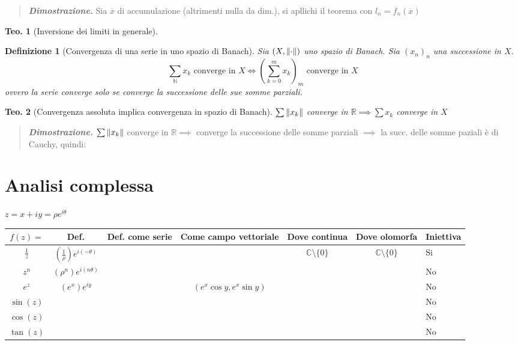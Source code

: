 \documentclass[a4paper,10pt]{article}
\newcommand{\re}{\mathbb{R}} %
\newcommand{\na}{\mathbb{N}} %
\newcommand{\im}{\mathbb{C}} %
\theoremstyle{indentdefinition}
\newtheorem{defn}{Definizione}[section]
\theoremstyle{indenttheorem}
\newtheorem{thm}{Teo.}
\theoremstyle{myremark}
\theoremstyle{indentgeneral}
\newenvironment{dimo}{\begin{quote}\textit{\textbf{Dimostrazione.}}}{\end{quote}} %
\begin{document}
\begin{dimo}
    Sia $\overline{x}$ di accumulazione (altrimenti nulla da dim.), si apllichi il teorema con $l_n=f_n(\overline{x})$
\end{dimo}
\begin{thm}[Inversione dei limiti in generale]
    
\end{thm}
\begin{defn}[Convergenza di una serie in uno spazio di Banach]
    Sia $(X,\norm{\cdot})$  uno spazio di Banach. Sia $(x_n)_n$ una successione in $X$.
$$\sum_\na x_k \text{ converge in $X$}\iff \left(\sum_{k=0}^mx_k\right)_m \text{ converge in $X$}$$
ovvero la serie converge solo se converge la successione delle sue somme parziali.
\end{defn}
\begin{thm}[Convergenza assoluta implica convergenza in spazio di Banach]
$\sum \norm{x_k}$ converge in $\re\implies \sum x_k$ converge in $X$
\end{thm}
\begin{dimo}
$\sum \norm{x_k}$ converge in $\re\implies$ converge la successione delle somme parziali $\implies$ la succ. delle somme paziali è di Cauchy, quindi:

    
\end{dimo}

\newpage
\part{Analisi complessa}
$z=x+iy=\rho e^{i\theta}$

\begin{table}[h]
    \centering
    \begin{tabular}{|c|c|c|c|c|c|l|} \hline 
         $f(z)=$&  Def. &Def. come serie&  Come campo  vettoriale&  Dove continua& Dove olomorfa &Iniettiva \\ \hline 
         $\frac{1}{z}$&  $(\frac{1}{\rho})e^{i(-\theta)}$&  &  &  $\im\setminus\{0\}$&  $\im\setminus\{0\}$&Si\\ \hline 
         $z^n$&  $(\rho^n)e^{i(n\theta)}$&  &  &  &  &No\\ \hline 
         $e^z$&  $(e^x)e^{iy}$&  &  $(e^x \cos y, e^x \sin y)$&  &  & No\\ \hline 
         $\sin(z)$&  &  &  &  &  & No\\ \hline 
         $\cos(z)$&  &  &  &  &  & No\\ \hline 
         $\tan(z)$&  &  &  &  &  & No\\ \hline
    \end{tabular}
\end{table}
\end{document}
